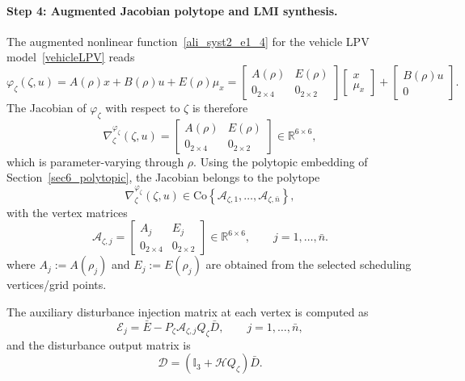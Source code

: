 \paragraph{Step 4: Augmented Jacobian polytope and LMI synthesis.}
The augmented nonlinear function~\eqref{ali_syst2_e1_4} for the vehicle LPV model~\eqref{vehicleLPV} reads
\begin{equation}\label{eq:vehicle_varphi_zeta}
\varphi_\zeta(\zeta,u) = A(\rho)x + B(\rho)u + E(\rho)\mu_x =
\begin{bmatrix}
A(\rho) & E(\rho) \\
0_{2\times 4} & 0_{2\times 2}
\end{bmatrix}
\begin{bmatrix} x \\ \mu_x \end{bmatrix}
+ \begin{bmatrix} B(\rho)u \\ 0 \end{bmatrix}.
\end{equation}
The Jacobian of $\varphi_\zeta$ with respect to $\zeta$ is therefore
\begin{equation}\label{eq:vehicle_jacobian_zeta}
\nabla^{\varphi_\zeta}_\zeta(\zeta,u) = 
\begin{bmatrix}
A(\rho) & E(\rho) \\
0_{2\times 4} & 0_{2\times 2}
\end{bmatrix} \in \mathbb{R}^{6\times 6},
\end{equation}
which is parameter-varying through $\rho$. Using the polytopic embedding of Section~\ref{sec6_polytopic}, the Jacobian belongs to the polytope
\begin{equation}\label{eq:vehicle_polytope_jacobian}
\nabla^{\varphi_\zeta}_\zeta(\zeta,u) \in \mathrm{Co}\left\{ \mathcal{A}_{\zeta,1},\dots,\mathcal{A}_{\zeta,\bar{n}} \right\},
\end{equation}
with the vertex matrices
\begin{equation}\label{eq:vehicle_Azeta_j}
\mathcal{A}_{\zeta,j} = 
\begin{bmatrix}
A_j & E_j \\
0_{2\times 4} & 0_{2\times 2}
\end{bmatrix} \in \mathbb{R}^{6\times 6}, \qquad j=1,\dots,\bar{n}.
\end{equation}
where $A_j:=A(\rho_j)$ and $E_j:=E(\rho_j)$ are obtained from the selected scheduling vertices/grid points.

The auxiliary disturbance injection matrix at each vertex is computed as
\begin{equation}\label{eq:vehicle_Ej}
\mathcal{E}_j = \bar{E} - P_\zeta \mathcal{A}_{\zeta,j} Q_\zeta \bar{D}, \qquad j=1,\dots,\bar{n},
\end{equation}
and the disturbance output matrix is
\begin{equation}
\mathcal{D} = \left(\mathbb{I}_{3} + \mathcal{H}Q_\zeta\right)\bar{D}.
\end{equation}

